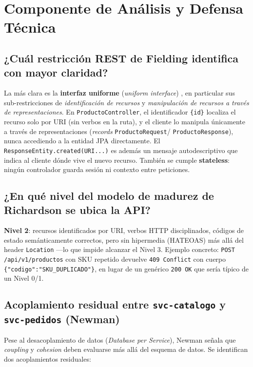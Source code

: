 \documentclass[11pt,a4paper]{article}
\begin{document}
\section{Componente de Análisis y Defensa Técnica}
\label{sec:analisis}

\subsection{¿Cuál restricción REST de Fielding identifica con mayor claridad?}

La más clara es la \textbf{interfaz uniforme} (\emph{uniform interface})
\cite{fielding2000}, en particular sus sub-restricciones de \emph{identificación
de recursos} y \emph{manipulación de recursos a través de representaciones}.
En \texttt{ProductoController}, el identificador \texttt{\{id\}} localiza el
recurso solo por URI (sin verbos en la ruta), y el cliente lo manipula
únicamente a través de representaciones (\emph{records} \texttt{ProductoRequest}/
\texttt{ProductoResponse}), nunca accediendo a la entidad JPA directamente. El
\texttt{ResponseEntity.created(URI...)} es además un mensaje autodescriptivo
que indica al cliente dónde vive el nuevo recurso. También se cumple
\textbf{stateless}: ningún controlador guarda sesión ni contexto entre
peticiones.

\subsection{¿En qué nivel del modelo de madurez de Richardson se ubica la API?}

\textbf{Nivel 2}: recursos identificados por URI, verbos HTTP disciplinados,
códigos de estado semánticamente correctos, pero sin hipermedia (HATEOAS) más
allá del header \texttt{Location} —lo que impide alcanzar el Nivel 3. Ejemplo
concreto: \texttt{POST /api/v1/productos} con SKU repetido devuelve
\texttt{409 Conflict} con cuerpo \texttt{\{"codigo":"SKU\_DUPLICADO"\}}, en
lugar de un genérico \texttt{200 OK} que sería típico de un Nivel 0/1.

\subsection{Acoplamiento residual entre \texttt{svc-catalogo} y \texttt{svc-pedidos} (Newman)}

Pese al desacoplamiento de datos (\emph{Database per Service}), Newman
\cite{newman2021} señala que \emph{coupling} y \emph{cohesion} deben
evaluarse más allá del esquema de datos. Se identifican dos acoplamientos
residuales:
\end{document}
